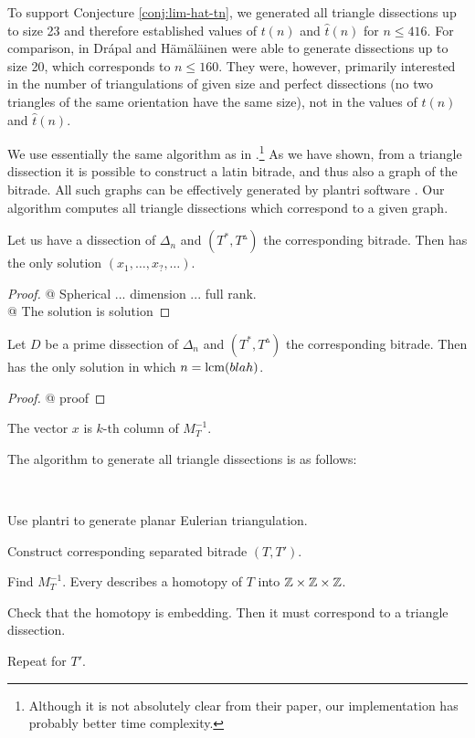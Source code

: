 To support Conjecture \ref{conj:lim-hat-tn}, we generated all triangle dissections up to size 23 and therefore established values of $t(n)$ and $\hat t(n)$ for $n \leq 416$. For comparison, in \cite{DrapalHamalainen10} Drápal and Hämäläinen were able to generate dissections up to size 20, which corresponds to $n \leq 160$. They were, however, primarily interested in the number of triangulations of given size and perfect dissections (no two triangles of the same orientation have the same size), not in the values of $t(n)$ and $\hat t(n)$.

We use essentially the same algorithm as in \cite{DrapalHamalainen10}.\footnote{Although it is not absolutely clear from their paper, our implementation has probably better time complexity.} As we have shown, from a triangle dissection it is possible to construct a latin bitrade, and thus also a graph of the bitrade. All such graphs can be effectively generated by plantri software \cite{BrinkmannMcKay99}. Our algorithm computes all triangle dissections which correspond to a given graph.


\begin{lem}
Let us have a dissection of $\Delta_n$ and $(T^*, T^\vartriangle)$ the corresponding bitrade. Then
%
has the only solution $(x_1,\dots,x_?,\dots)$.
\end{lem}
\begin{proof}
@ Spherical ... dimension ... full rank. \\
@ The solution is solution
\end{proof}

\begin{lem}
Let $D$ be a prime dissection of $\Delta_n$ and $(T^*, T^\vartriangle)$ the corresponding bitrade. Then
%
has the only solution in which $n = \mathop{\mathrm{lcm}}(blah)$.
\end{lem}
\begin{proof}
@ proof
\end{proof}

\begin{cor}
The vector $x$ is $k$-th column of $M_T^{-1}$.
\end{cor}%

The algorithm to generate all triangle dissections is as follows:

\begin{alg}\ 
\begin{cosyenumerate}
	\item Use plantri to generate planar Eulerian triangulation.
	\item Construct corresponding separated bitrade $(T,T')$.
	\item Find $M_T^{-1}$. Every  describes a homotopy of $T$ into $\mathbb Z\times\mathbb Z\times\mathbb Z$.
	\item Check that the homotopy is embedding. Then it must correspond to a triangle dissection.
	\item Repeat for $T'$.
\end{cosyenumerate}
\end{alg}%

